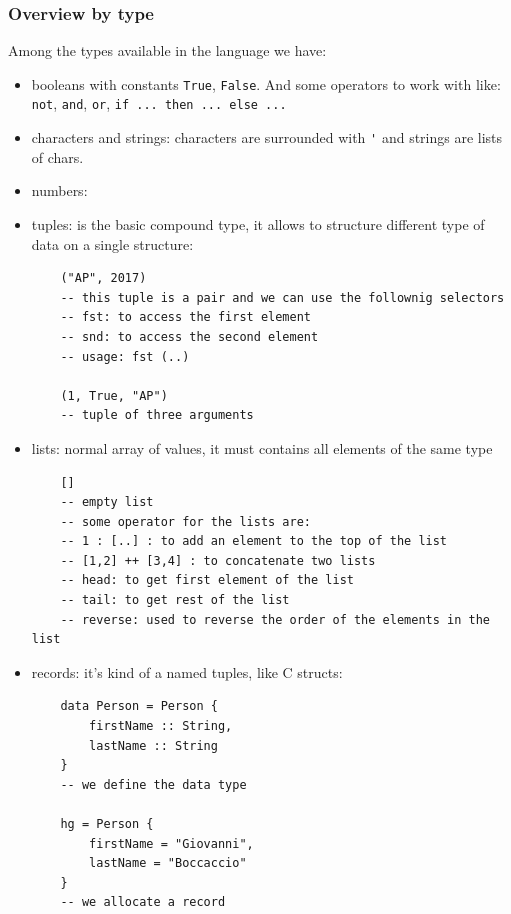 \subsubsection{Overview by type}
Among the types available in the language we have:
\begin{itemize}
    \item booleans with constants \verb|True|, \verb|False|.
    And some operators to work with like: \verb|not|, \verb|and|, \verb|or|, \verb|if ... then ... else ...|

    \item characters and strings: characters are surrounded with \verb|'| and strings are lists of chars.

    \item numbers: 
    \item tuples: is the basic compound type, it allows to structure different type of data on a single structure:
\begin{verbatim}
    ("AP", 2017)
    -- this tuple is a pair and we can use the follownig selectors
    -- fst: to access the first element
    -- snd: to access the second element
    -- usage: fst (..)

    (1, True, "AP")
    -- tuple of three arguments
\end{verbatim}

    \item lists: normal array of values, it must contains all elements of the same type
\begin{verbatim}
    []
    -- empty list
    -- some operator for the lists are:
    -- 1 : [..] : to add an element to the top of the list
    -- [1,2] ++ [3,4] : to concatenate two lists
    -- head: to get first element of the list
    -- tail: to get rest of the list
    -- reverse: used to reverse the order of the elements in the list
\end{verbatim}

    \item records: it's kind of a named tuples, like C structs:
\begin{verbatim}
    data Person = Person {
        firstName :: String,
        lastName :: String
    }
    -- we define the data type

    hg = Person {
        firstName = "Giovanni",
        lastName = "Boccaccio"
    }
    -- we allocate a record
\end{verbatim}
\end{itemize}

